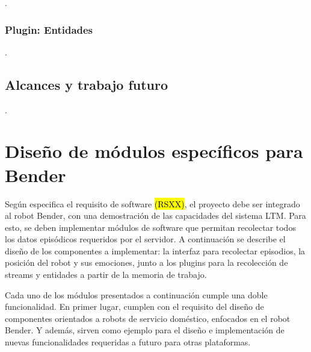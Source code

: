 .

\subsubsection{Plugin: Entidades}

.


\subsection{Alcances y trabajo futuro}
 .


\section{Diseño de módulos específicos para Bender}

Según especifica el requisito de software \hl{(RSXX)}, el proyecto debe ser integrado al robot Bender, con una demostración de las capacidades del sistema LTM. Para esto, se deben implementar módulos de software que permitan recolectar todos los datos episódicos requeridos por el servidor. A continuación se describe el diseño de los componentes a implementar: la interfaz para recolectar episodios, la posición del robot y sus emociones, junto a los plugins para la recolección de streams y entidades a partir de la memoria de trabajo. 

Cada uno de los módulos presentados a continuación cumple una doble funcionalidad. En primer lugar, cumplen con el requisito del diseño de componentes orientados a robots de servicio doméstico, enfocados en el robot Bender. Y además, sirven como ejemplo para el diseño e implementación de nuevas funcionalidades requeridas a futuro para otras plataformas.


